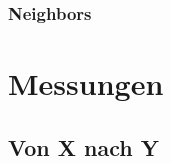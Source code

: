 \subsubsection{Neighbors}



\section{Messungen}
\label{appendix:measures}
\subsection{Von X nach Y}




%  
% 

